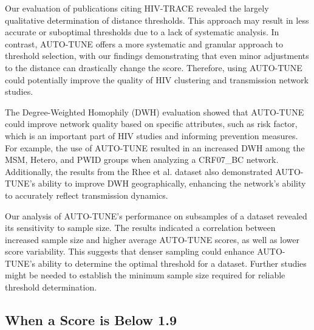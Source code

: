 \documentclass[utf8]{FrontiersinHarvard} %
\begin{document}
Our evaluation of publications citing HIV-TRACE revealed the largely
qualitative determination of distance thresholds. This approach may result in
less accurate or suboptimal thresholds due to a lack of systematic analysis. In
contrast, AUTO-TUNE offers a more systematic and granular approach to threshold
selection, with our findings demonstrating that even minor adjustments to the
distance can drastically change the score. Therefore, using AUTO-TUNE could
potentially improve the quality of HIV clustering and transmission network
studies.

The Degree-Weighted Homophily (DWH) evaluation showed that AUTO-TUNE could
improve network quality based on specific attributes, such as risk factor,
which is an important part of HIV studies and informing prevention measures.
\cite{TODO} For example, the use of AUTO-TUNE resulted in an increased DWH
among the MSM, Hetero, and PWID groups when analyzing a CRF07\_BC network.
Additionally, the results from the Rhee et al. dataset also demonstrated
AUTO-TUNE's ability to improve DWH geographically, enhancing the network's
ability to accurately reflect transmission dynamics.

Our analysis of AUTO-TUNE's performance on subsamples of a dataset revealed its
sensitivity to sample size. The results indicated a correlation between
increased sample size and higher average AUTO-TUNE scores, as well as lower
score variability. This suggests that denser sampling could enhance AUTO-TUNE's
ability to determine the optimal threshold for a dataset. Further studies might
be needed to establish the minimum sample size required for reliable threshold
determination.

\subsection{When a Score is Below 1.9}
\end{document}
